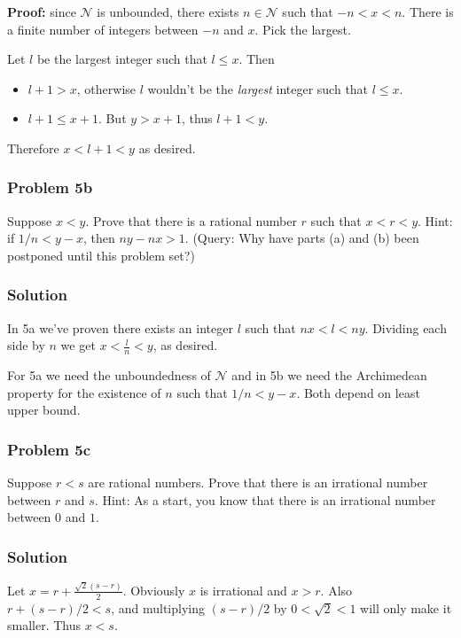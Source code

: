 \textbf{Proof:} since $\mathcal{N}$ is unbounded, there exists
$n\in\mathcal{N}$ such that $-n<x<n$. There is a finite number of integers between
$-n$ and $x$. Pick the largest.

\vs

Let $l$ be the largest integer such that $l\leq x$. Then
\begin{itemize}
\item $l+1>x$, otherwise $l$ wouldn't be the \textit{largest} integer
  such that $l\leq x$.
\item $l+1\leq x+1$. But $y>x+1$, thus $l+1<y$.
\end{itemize}

Therefore $x<l+1<y$ as desired.

\subsubsection*{Problem 5b}
Suppose $x<y$. Prove that there is a rational number $r$ such that
$x<r<y$. Hint: if $1/n<y-x$, then $ny-nx>1$. (Query: Why have parts
(a) and (b) been postponed until this problem set?)

\subsubsection*{Solution}
In 5a we've proven there exists an integer $l$ such that $nx<l<ny$.
Dividing each side by $n$ we get $x<\frac{l}{n}<y$, as desired.

\vs

For 5a we need the unboundedness of $\mathcal{N}$ and in 5b we need the
Archimedean property for the existence of $n$ such that $1/n<y-x$.
Both depend on least upper bound.

\subsubsection*{Problem 5c}
Suppose $r<s$ are rational numbers. Prove that there is an irrational
number between $r$ and $s$. Hint: As a start, you know that there is
an irrational number between $0$ and $1$.

\subsubsection*{Solution}
Let $x=r+\frac{\sqrt{2}(s-r)}{2}$. Obviously $x$ is irrational and
$x>r$. Also $r+(s-r)/2<s$, and multiplying $(s-r)/2$ by $0<\sqrt{2}<1$
will only make it smaller. Thus $x<s$.

